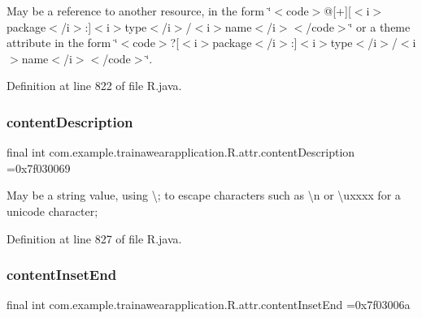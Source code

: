 May be a reference to another resource, in the form \char`\"{}$<$code$>$@\mbox{[}+\mbox{]}\mbox{[}$<$i$>$package$<$/i$>$\+:\mbox{]}$<$i$>$type$<$/i$>$/$<$i$>$name$<$/i$>$$<$/code$>$\char`\"{} or a theme attribute in the form \char`\"{}$<$code$>$?\mbox{[}$<$i$>$package$<$/i$>$\+:\mbox{]}$<$i$>$type$<$/i$>$/$<$i$>$name$<$/i$>$$<$/code$>$\char`\"{}. 

Definition at line 822 of file R.\+java.

\mbox{\label{classcom_1_1example_1_1trainawearapplication_1_1_r_1_1attr_ac8f7f9714d668bc772f16109768289bc}} 
\subsubsection{\texorpdfstring{contentDescription}{contentDescription}}
{\footnotesize\ttfamily final int com.\+example.\+trainawearapplication.\+R.\+attr.\+content\+Description =0x7f030069\hspace{0.3cm}{\ttfamily [static]}}

May be a string value, using \textquotesingle{}\textbackslash{};\textquotesingle{} to escape characters such as \textquotesingle{}\textbackslash{}n\textquotesingle{} or \textquotesingle{}\textbackslash{}uxxxx\textquotesingle{} for a unicode character; 

Definition at line 827 of file R.\+java.

\mbox{\label{classcom_1_1example_1_1trainawearapplication_1_1_r_1_1attr_a06d18dbc6c7a98246499e7539f24dafd}} 
\subsubsection{\texorpdfstring{contentInsetEnd}{contentInsetEnd}}
{\footnotesize\ttfamily final int com.\+example.\+trainawearapplication.\+R.\+attr.\+content\+Inset\+End =0x7f03006a\hspace{0.3cm}{\ttfamily [static]}}

